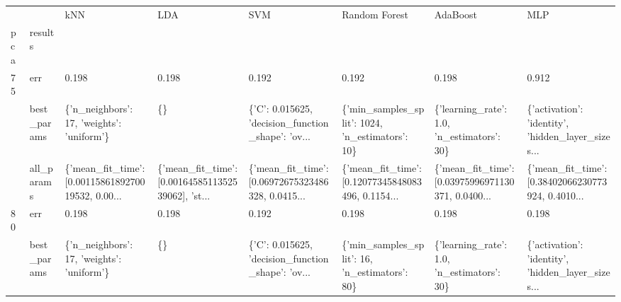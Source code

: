 \begin{tabular}{llllllll}
\toprule
    &            &                                                kNN &                                                LDA &                                                SVM &                                      Random Forest &                                           AdaBoost &                                                MLP \\
pca & results &                                                    &                                                    &                                                    &                                                    &                                                    &                                                    \\
\midrule
75  & err &                                              0.198 &                                              0.198 &                                              0.192 &                                              0.192 &                                              0.198 &                                              0.912 \\
    & best\_params &          \{'n\_neighbors': 17, 'weights': 'uniform'\} &                                                 \{\} &  \{'C': 0.015625, 'decision\_function\_shape': 'ov... &    \{'min\_samples\_split': 1024, 'n\_estimators': 10\} &         \{'learning\_rate': 1.0, 'n\_estimators': 30\} &  \{'activation': 'identity', 'hidden\_layer\_sizes... \\
    & all\_params &  \{'mean\_fit\_time': [0.0011586189270019532, 0.00... &  \{'mean\_fit\_time': [0.0016458511352539062], 'st... &  \{'mean\_fit\_time': [0.06972675323486328, 0.0415... &  \{'mean\_fit\_time': [0.12077345848083496, 0.1154... &  \{'mean\_fit\_time': [0.03975996971130371, 0.0400... &  \{'mean\_fit\_time': [0.38402066230773924, 0.4010... \\
80  & err &                                              0.198 &                                              0.198 &                                              0.192 &                                              0.198 &                                              0.198 &                                              0.198 \\
    & best\_params &          \{'n\_neighbors': 17, 'weights': 'uniform'\} &                                                 \{\} &  \{'C': 0.015625, 'decision\_function\_shape': 'ov... &      \{'min\_samples\_split': 16, 'n\_estimators': 80\} &         \{'learning\_rate': 1.0, 'n\_estimators': 30\} &  \{'activation': 'identity', 'hidden\_layer\_sizes... \\

\end{tabular}
